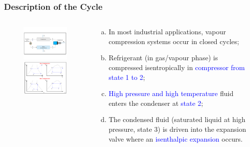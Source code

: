\documentclass[10pt,compress]{beamer}
\begin{document}
\begin{frame}
 \frametitle{Description of the Cycle}
  \begin{columns}
   \begin{column}[c]{0.55\linewidth}
    \begin{figure}%
     \vbox{
      \includegraphics[width=5.5cm,clip]{./Pics/Overview_Refrig12}
      \vspace{-.5cm}
      \includegraphics[width=4.5cm,clip]{./Pics/Overview_Refrig13}}
    \end{figure}  
   \end{column}  
   \begin{column}[c]{0.45\linewidth}
  \begin{enumerate}[(a)]
   \item <1-> In most industrial applications, vapour compression systems occur in closed cycles;
   \item <2-> Refrigerant (in gas/vapour phase) is compressed isentropically in \textcolor{blue}{compressor from state 1 to 2}; 
   \item <3-> \textcolor{blue}{High pressure and high temperature} fluid enters the condenser at \textcolor{blue}{state 2};
   \item <4-> The condensed fluid (saturated liquid at high pressure, state 3) is driven into the expansion valve where an \textcolor{blue}{isenthalpic expansion} occurs.
  \end{enumerate}
 \end{column}  
\end{columns}
\end{frame}
\end{document}
